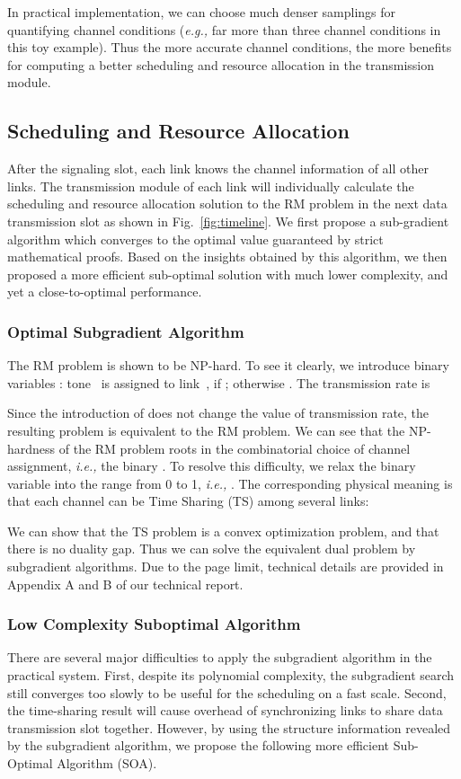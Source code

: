 \documentclass[conference]{IEEEtran}
\newcommand{\ie}{\emph{i.e., }}
\newcommand{\eg}{\emph{e.g., }}
\begin{document}
In practical implementation, we can choose much denser samplings for quantifying channel conditions  (\eg far more than three channel conditions in this toy example). Thus the more accurate channel conditions, the more benefits for computing a better scheduling and resource allocation in the transmission module.



\subsection{Scheduling and Resource Allocation}
\label{sec:scheduling}
After the signaling slot, each link knows the channel information of all other links. The transmission module of each link will individually calculate the scheduling and resource allocation solution to the RM problem in the next data transmission slot as shown in Fig.~\ref{fig:timeline}. We first propose a sub-gradient algorithm which converges to the optimal value guaranteed by strict mathematical proofs. Based on the insights obtained by this algorithm, we then proposed a more efficient sub-optimal solution with much lower complexity, and yet a close-to-optimal performance.


\subsubsection{Optimal Subgradient Algorithm}
\label{sec:opt-algorithm}
The RM problem is shown to be NP-hard. To see it clearly, we introduce binary variables : tone~ is assigned to link~, if ; otherwise . The transmission rate is

Since the introduction of  does not change the value of transmission rate, the resulting problem is equivalent to the RM problem. We can see that the NP-hardness of the RM problem roots in the combinatorial choice of channel assignment, \ie the binary .
To resolve this difficulty, we relax the binary variable  into the range from 0 to 1, \ie . The corresponding physical meaning is that each channel can be Time Sharing (TS) among several links:

We can show that the TS problem is a convex optimization problem, and that there is no duality gap.  Thus we can solve the equivalent dual problem by subgradient algorithms\cite{Bertsekas1999nonlinear}. Due to the page limit, technical details are provided in Appendix A and B of our technical report.




\subsubsection{Low Complexity Suboptimal Algorithm}
\label{sec:sub-algorithm}
There are several major difficulties to apply the subgradient algorithm in the practical system. First, despite its polynomial complexity, the subgradient search still converges too slowly to be useful for the scheduling on a fast scale. Second, the time-sharing result will cause overhead of synchronizing links to share data transmission slot together. However,  by using the structure information revealed by the subgradient algorithm, we propose the following more efficient Sub-Optimal Algorithm (SOA).
\end{document}
